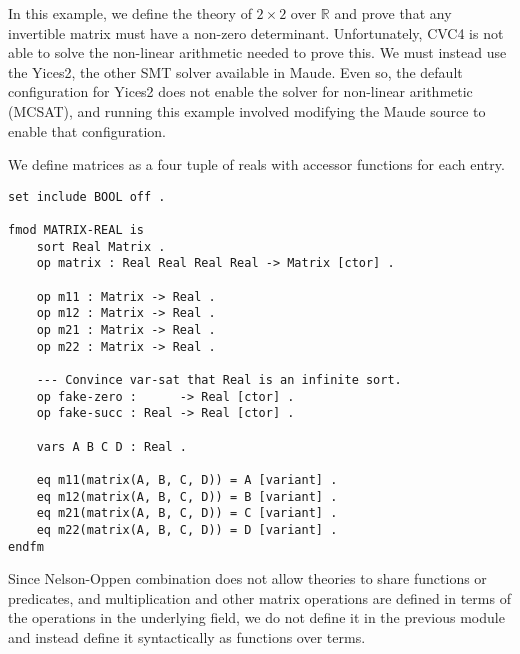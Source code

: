 \documentclass[]{article}
\begin{document}
In this example, we define the theory of \(2\times 2\) over
\(\mathbb{R}\) and prove that any invertible matrix must have a non-zero
determinant. Unfortunately, CVC4 is not able to solve the non-linear
arithmetic needed to prove this. We must instead use the Yices2, the
other SMT solver available in Maude. Even so, the default configuration
for Yices2 does not enable the solver for non-linear arithmetic (MCSAT),
and running this example involved modifying the Maude source to enable
that configuration.

We define matrices as a four tuple of reals with accessor functions for
each entry.

\begin{verbatim}
set include BOOL off .

fmod MATRIX-REAL is
    sort Real Matrix .
    op matrix : Real Real Real Real -> Matrix [ctor] .
    
    op m11 : Matrix -> Real .
    op m12 : Matrix -> Real .
    op m21 : Matrix -> Real .
    op m22 : Matrix -> Real .

    --- Convince var-sat that Real is an infinite sort.
    op fake-zero :      -> Real [ctor] .
    op fake-succ : Real -> Real [ctor] .

    vars A B C D : Real .

    eq m11(matrix(A, B, C, D)) = A [variant] .
    eq m12(matrix(A, B, C, D)) = B [variant] .
    eq m21(matrix(A, B, C, D)) = C [variant] .
    eq m22(matrix(A, B, C, D)) = D [variant] .
endfm
\end{verbatim}

Since Nelson-Oppen combination does not allow theories to share
functions or predicates, and multiplication and other matrix operations
are defined in terms of the operations in the underlying field, we do
not define it in the previous module and instead define it syntactically
as functions over terms.
\end{document}
